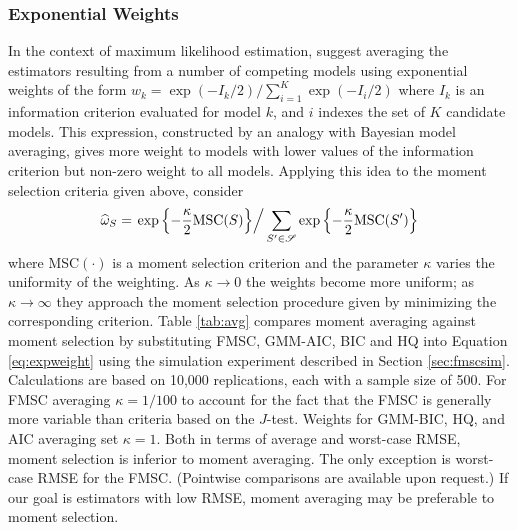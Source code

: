 \documentclass[12pt]{article}
\theoremstyle{definition}
\begin{document}
\subsubsection{Exponential Weights}
In the context of maximum likelihood estimation, \cite{Burnhametal} suggest averaging the estimators resulting from a number of competing models using exponential weights of the form $w_k = \exp(-I_k/2)/\sum_{i=1}^K \exp(-I_i/2)$ where $I_k$ is an information criterion evaluated for model $k$, and $i$ indexes the set of $K$ candidate models. This expression, constructed by an analogy with Bayesian model averaging, gives more weight to models with lower values of the information criterion but non-zero weight to all models. Applying this idea to the moment selection criteria given above, consider
	\begin{equation}	
		\widehat{\omega}_S = \left.\exp\left\{-\frac{\kappa}{2} \mbox{MSC}(S)\right\}\right/\sum_{S' \in \mathscr{S}}\exp\left\{-\frac{\kappa}{2} \mbox{MSC}(S')\right\}
		\label{eq:expweight}
\end{equation}
where MSC$(\cdot)$ is a moment selection criterion and the parameter $\kappa$ varies the uniformity of the weighting. As $\kappa \rightarrow 0$ the weights become more uniform; as $\kappa \rightarrow \infty$ they approach the moment selection procedure given by minimizing the corresponding criterion. Table \ref{tab:avg} compares moment averaging against moment selection by substituting FMSC, GMM-AIC, BIC and HQ into Equation \ref{eq:expweight} using the simulation experiment described in Section \ref{sec:fmscsim}. Calculations are based on 10,000 replications, each with a sample size of 500. For FMSC averaging $\kappa = 1/100$ to account for the fact that the FMSC is generally more variable than criteria based on the $J$-test. Weights for GMM-BIC, HQ, and AIC averaging set $\kappa = 1$. Both in terms of average and worst-case RMSE, moment selection is inferior to moment averaging. The only exception is worst-case RMSE for the FMSC. (Pointwise comparisons are available upon request.) If our goal is estimators with low RMSE, moment averaging may be preferable to moment selection. 
\end{document}
